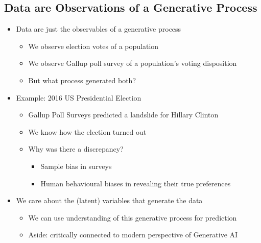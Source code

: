 \documentclass[11pt]{article}
\theoremstyle{definition}
\begin{document}
\subsection{Data are Observations of a Generative Process}
\begin{itemize}
  \item Data are just the observables of a generative process
  \begin{itemize}
    \item We observe election votes of a population
    \item We observe Gallup poll survey of a population’s voting disposition
    \item But what process generated both?
  \end{itemize}
  \item Example: 2016 US Presidential Election
  \begin{itemize}
    \item Gallup Poll Surveys predicted a landslide for Hillary Clinton
    \item We know how the election turned out
    \item Why was there a discrepancy?
    \begin{itemize}
      \item Sample bias in surveys
      \item Human behavioural biases in revealing their true preferences
    \end{itemize}
  \end{itemize}
  \item We care about the (latent) variables that generate the data
  \begin{itemize}
    \item We can use understanding of this generative process for prediction
    \item Aside: critically connected to modern perspective of Generative AI
  \end{itemize}
\end{itemize}
\end{document}
